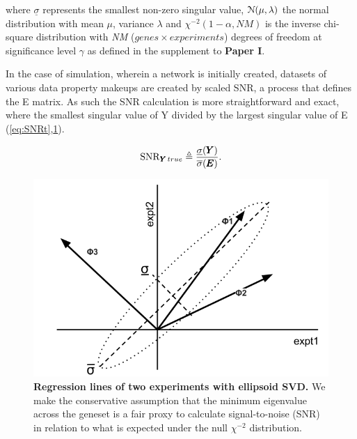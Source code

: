 where $\underline{\sigma}$ represents the smallest non-zero singular value, $\operatorname{\mathcal{N}(\mu,\lambda)}$ the normal distribution with mean $\mu$, variance $\lambda$ and $\chi^{-2}(1-\alpha,NM)$ is the inverse chi-square distribution with \emph{NM} ($genes \times experiments$) degrees of freedom at significance level $\gamma$ as defined in the supplement to \textbf{Paper I}.

In the case of simulation, wherein a network is initially created, datasets of various data property makeups are created by scaled SNR, a process that defines the E matrix. As such the SNR calculation is more straightforward and exact, where the smallest singular value of Y divided by the largest singular value of E (\cref{eq:SNRt},\cref{fig:SNR}).

\begin{equation}
    \operatorname{SNR}_{{\pmb{Y}}\,true} \triangleq \frac{\underline{\sigma}({\pmb{Y}})}{\overline{\sigma}({\pmb{E}})}.
  \label{eq:SNRt}
\end{equation} 

\begin{figure}[H]
  \begin{center}
    \includegraphics[width=1\linewidth]{4/matrixSNR.png}
  \end{center}
  \caption{\textbf{Regression lines of two experiments with ellipsoid SVD.} We make the conservative assumption that the minimum eigenvalue across the geneset is a fair proxy to calculate signal-to-noise (SNR) in relation to what is expected under the null $\chi^{-2}$ distribution.}
  \label{fig:SNR}
\end{figure}

